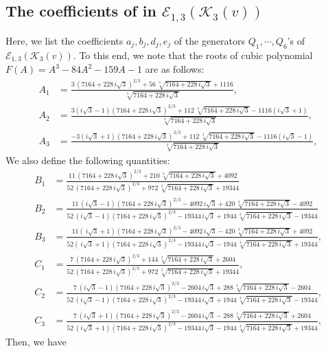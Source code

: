 \documentclass[11pt]{amsart}
\newcommand{\Ee}{{\mathcal E}}
\newcommand{\KK}{{\mathcal K}}
\numberwithin{equation}{section}
\numberwithin{table}{section}
\newcommand\<{\langle}
\begin{document}

\subsection{The coefficients of   in $\Ee_{1,3}(\KK_3(v))$}
\label{a1-3}
Here, we list the coefficients $a_j, b_j, d_j, e_j$ of the  generators
$Q_1, \cdots, Q_6$'s of $\Ee_{1,3}(\KK_3 (v))$. To this end, we note that the roots of 
cubic polynomial $F(A)=A^3-84 A^2 - 159 A-1$  are as follows:
\begin{align*}
	A_1& ={\frac {3\, \left( 7164+228\,i\sqrt {3} \right) ^{2/3}+56\,\sqrt [3]{
				7164+228\,i\sqrt {3}}+1116}{\sqrt [3]{7164+228\,i\sqrt {3}}}},\\
	A_2& = {\frac {3 (i \sqrt {3}-1) \left( 7164+228\,i\sqrt {3} \right) ^{2/3}
			+112\,	\sqrt [3]{7164+228\,i\sqrt {3}}-1116(i\sqrt {3} +1)}{\sqrt [3]{7164+228\,i\sqrt {3}}}},\\
	A_3&= {\frac {-3 (i \sqrt {3}+1) \left( 7164+228\,i\sqrt {3} \right) ^{2/3}
			+112\,	\sqrt [3]{7164+228\,i\sqrt {3}}-1116(i\sqrt {3} -1)}{\sqrt [3]{7164+228\,i\sqrt {3}}}},
\end{align*}
We also define the following quantities:	
\begin{align*}
	B_1& = \frac{ 11\, \left( 7164+228\,i\sqrt {3} \right) ^{2/3}+210\,	\sqrt [3]{7164+228\,i\sqrt {3}}+4092  }
	{ 52\, \left( 7164+228\,i\sqrt {3} \right)^{2/3}+972\,	\sqrt [3]{7164+228\,i\sqrt {3}}+19344 } \\ 
	B_2 & =	{\frac {11\, \left( i\sqrt {3}-1 \right)  \left( 7164+228\,i\sqrt {3}
			\right) ^{2/3}-4092\,i\sqrt {3}+420\,\sqrt [3]{7164+228\,i\sqrt {3}}-
			4092}{52\, \left( i\sqrt {3}-1 \right)  \left( 7164+228\,i\sqrt {3}
			\right) ^{2/3}-19344\,i\sqrt {3}+1944\,\sqrt [3]{7164+228\,i\sqrt {3}
			}-19344}}\\
	B_3 & = \frac{ 11 \left(\,i\sqrt {3}+1 \right)  \left( 7164+228\,i\sqrt {3}
		\right) ^{2/3}-4092\,i\sqrt {3}-420\,\sqrt [3]{7164+228\,i\sqrt {3}}+
		4092}{ 52	\left( \,i\sqrt {3}+1 \right)  \left( 7164+228\,i\sqrt {3}
		\right) ^{2/3}-19344\,i\sqrt {3}-1944\,\sqrt [3]{7164+228\,i\sqrt {3}
		}+19344},\\
	C_1&  ={\frac {7\, \left( 7164+228\,i\sqrt {3} \right) ^{2/3}+144\,\sqrt [3]{
				7164+228\,i\sqrt {3}}+2604}{52\, \left( 7164+228\,i\sqrt {3} \right) ^
			{2/3}+972\,\sqrt [3]{7164+228\,i\sqrt {3}}+19344}},\\
	C_2& = {\frac {7\, \left( i\sqrt {3}-1 \right)  \left( 7164+228\,i\sqrt {3}
			\right) ^{2/3}-2604\,i\sqrt {3}+288\,\sqrt [3]{7164+228\,i\sqrt {3}}-
			2604}{52\, \left( i\sqrt {3}-1 \right)  \left( 7164+228\,i\sqrt {3}
			\right) ^{2/3}-19344\,i\sqrt {3}+1944\,\sqrt [3]{7164+228\,i\sqrt {3}
			}-19344}},\\
	C_3& = {\frac {7\, \left( i\sqrt {3}+1 \right)  \left( 7164+228\,i\sqrt {3}
			\right) ^{2/3}-2604\,i\sqrt {3}-288\,\sqrt [3]{7164+228\,i\sqrt {3}}+
			2604}{52\, \left( i\sqrt {3}+1 \right)  \left( 7164+228\,i\sqrt {3}
			\right) ^{2/3}-19344\,i\sqrt {3}-1944\,\sqrt [3]{7164+228\,i\sqrt {3}
			}+19344}},
\end{align*}
Then, we have 
\end{document}
